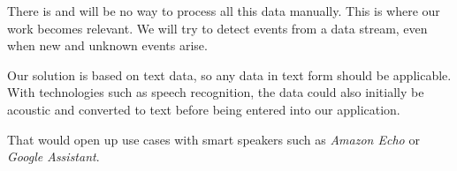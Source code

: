 There is and will be no way to process all this data manually.
This is where our work becomes relevant.
We will try to detect events from a data stream, even when new and unknown events arise.

Our solution is based on text data, so any data in text form should be applicable.
With technologies such as speech recognition, the data could also initially be acoustic
and converted to text before being entered into our application.

That would open up use cases with smart speakers such as \textit{Amazon Echo} or \textit{Google Assistant}.

